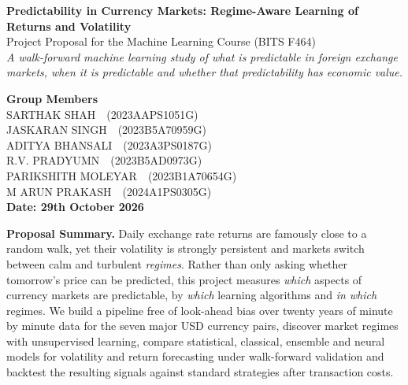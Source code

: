 \documentclass[11pt,a4paper]{article}
\begin{document}
\begin{tcolorbox}[enhanced,colback=boxfill,colframe=navy,arc=3mm,boxrule=0.8pt,
                  left=5mm,right=5mm,top=4mm,bottom=4mm]
{\LARGE\bfseries\color{navy}Predictability in Currency Markets: Regime-Aware Learning of Returns and Volatility}\\[4pt]
{\large\color{softgray}Project Proposal for the Machine Learning Course (BITS F464)}\\[3pt]
{\itshape\small A walk-forward machine learning study of what is predictable in foreign exchange markets, when it is predictable and whether that predictability has economic value.}

\vspace{5mm}
\begin{center}
{\large\bfseries Group Members}\\[4pt]
SARTHAK SHAH~~(2023AAPS1051G)\\
JASKARAN SINGH~~(2023B5A70959G)\\
ADITYA BHANSALI~~(2023A3PS0187G)\\
R.V. PRADYUMN~~(2023B5AD0973G)\\
PARIKSHITH MOLEYAR~~(2023B1A70654G)\\
M ARUN PRAKASH~~(2024A1PS0305G)\\[8pt]
{\bfseries Date: 29th October 2026}
\end{center}

\begin{tcolorbox}[colback=white,colframe=gray!30,arc=2mm,boxrule=0.4pt,left=4mm,right=4mm,top=2mm,bottom=2mm]
\textbf{Proposal Summary.} Daily exchange rate returns are famously close to a random walk, yet their
volatility is strongly persistent and markets switch between calm and turbulent \emph{regimes}. Rather than
only asking whether tomorrow's price can be predicted, this project measures \emph{which} aspects of currency
markets are predictable, by \emph{which} learning algorithms and \emph{in which} regimes. We build a pipeline free of look-ahead bias over twenty years of minute by minute data for the seven major USD currency pairs, discover
market regimes with unsupervised learning, compare statistical, classical, ensemble and neural models for
volatility and return forecasting under walk-forward validation and backtest the resulting signals against
standard strategies after transaction costs.
\end{tcolorbox}
\end{tcolorbox}
\end{document}
